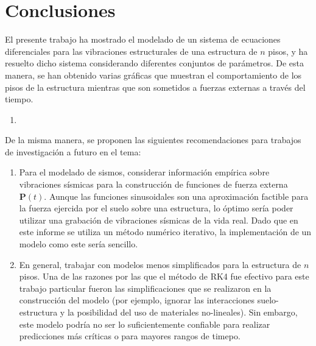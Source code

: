 \section{Conclusiones}

El presente trabajo ha mostrado el modelado de un sistema de ecuaciones diferenciales para las vibraciones estructurales de una estructura de \(n\) pisos, y ha resuelto dicho sistema considerando diferentes conjuntos de parámetros. De esta manera, se han obtenido varias gráficas que muestran el comportamiento de los pisos de la estructura mientras que son sometidos a fuerzas externas a través del tiempo.

\begin{enumerate}
    \item 
\end{enumerate}

De la misma manera, se proponen las siguientes recomendaciones para trabajos de investigación a futuro en el tema:

\begin{enumerate}
    \item Para el modelado de sismos, considerar información empírica sobre vibraciones sísmicas para la construcción de funciones de fuerza externa \(\mathbf{P}(t)\). Aunque las funciones sinusoidales son una aproximación factible para la fuerza ejercida por el suelo sobre una estructura, lo óptimo sería poder utilizar una grabación de vibraciones sísmicas de la vida real. Dado que en este informe se utiliza un método numérico iterativo, la implementación de un modelo como este sería sencillo.

    \item En general, trabajar con modelos menos simplificados para la estructura de \(n\) pisos. Una de las razones por las que el método de RK4 fue efectivo para este trabajo particular fueron las simplificaciones que se realizaron en la construcción del modelo (por ejemplo, ignorar las interacciones suelo-estructura y la posibilidad del uso de materiales no-lineales). Sin embargo, este modelo podría no ser lo suficientemente confiable para realizar predicciones más críticas o para mayores rangos de timepo.
\end{enumerate}
